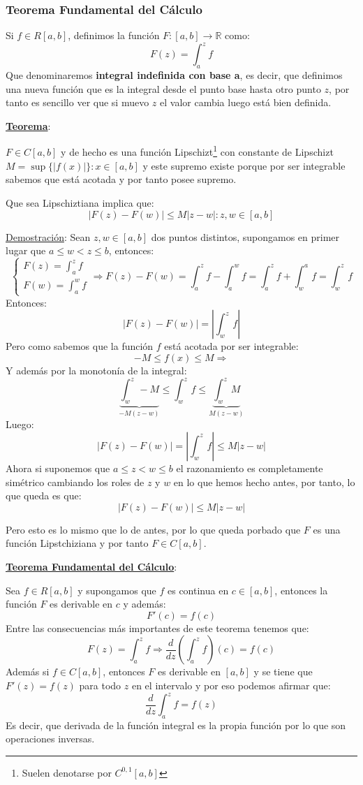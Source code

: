 \documentclass[10pt,a4paper,openright]{book}
\begin{document}
\subsubsection*{Teorema Fundamental del Cálculo}
Si $f\in R[a,b]$, definimos la función $F:[a,b]\rightarrow \mathbb R$ como:
$$F(z)=\int_{a}^{z} f$$
Que denominaremos \textbf{integral indefinida con base a}, es decir, que definimos una nueva función que es la integral desde el punto base hasta otro punto $z$, por tanto es sencillo ver que si muevo $z$ el valor cambia luego está bien definida.

\underline{\textbf{Teorema}}:

$F\in C[a,b]$ y de hecho es una función Lipschizt\footnote{Suelen denotarse por $C^{0,1}[a,b]$} con constante de Lipschizt $M=  \sup\{|f(x)|\}: x\in [a,b]$ y este supremo existe porque por ser integrable sabemos que está acotada y por tanto posee supremo.

Que sea Lipschiztiana implica que:
$$|F(z)-F(w)|\leq M |z-w|: z,w\in [a,b]$$

\underline{Demostración}:
Sean $z,w\in [a,b]$ dos puntos distintos, supongamos en primer lugar que $a\leq w<z\leq b$, entonces:
$$\begin{cases} F(z)= \int_{a}^{z} f \\ F(w) = \int_{a}^{w} f \end{cases}\Rightarrow F(z)-F(w) = \int_{a}^{z} f -\int_{a}^{w} f = \int_{a}^{z} f +\int_{w}^{a} f = \int_{w}^{z} f$$
Entonces:
$$|F(z)-F(w)| = \left|\int_{w}^{z} f \right|$$
Pero como sabemos que la función $f$ está acotada por ser integrable:
$$-M \leq f(x) \leq M \Rightarrow$$
Y además por la monotonía de la integral:
$$\underbrace{\int_{w}^{z} -M}_{-M(z-w)} \leq \int_{w}^{z} f\leq \underbrace{\int_{w}^{z} M}_{M(z-w)}$$
Luego:
$$|F(z)-F(w)| = \left|\int_{w}^{z} f \right| \leq M|z-w| $$
Ahora si suponemos que $a\leq z<w\leq b$ el razonamiento es completamente simétrico cambiando los roles de $z$ y $w$ en lo que hemos hecho antes, por tanto, lo que queda es que:
$$|F(z)-F(w)| \leq M|z-w| $$

Pero esto es lo mismo que lo de antes, por lo que queda porbado que $F$ es una función Lipstchiziana y por tanto $F\in C[a,b]$.

\underline{\textbf{Teorema Fundamental del Cálculo}}:

Sea $f\in R[a,b]$ y supongamos que $f$ es continua en $c\in [a,b]$, entonces la función $F$ es derivable en $c$ y además:
$$F'(c) = f(c)$$
Entre las consecuencias más importantes de este teorema tenemos que:
$$F(z) = \int_{a}^{z} f\Rightarrow \frac{d}{dz}\left(\int_{a}^{z} f\right) (c) = f(c)$$
Además si $f\in C[a,b]$, entonces $F$ es derivable en $[a,b]$ y se tiene que $F'(z) = f(z)$ para todo $z$ en el intervalo y por eso podemos afirmar que:
$$\frac{d}{dz} \int_{a}^{z} f = f(z)$$
Es decir, que derivada de la función integral es la propia función por lo que son operaciones inversas.
\end{document}
